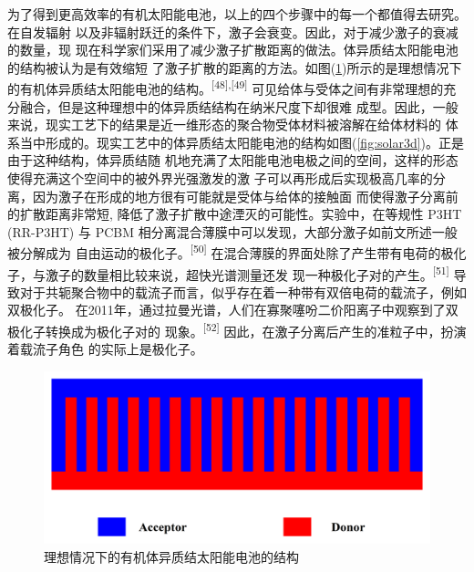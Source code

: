 \documentclass[12pt,]{report}
\begin{document}
为了得到更高效率的有机太阳能电池，以上的四个步骤中的每一个都值得去研究。在自发辐射
以及非辐射跃迁的条件下，激子会衰变。因此，对于减少激子的衰减的数量，现
现在科学家们采用了减少激子扩散距离的做法。体异质结太阳能电池的结构被认为是有效缩短
了激子扩散的距离的方法。如图(\ref{fig:solar})所示的是理想情况下的有机体异质结太阳能电池的结构。\textsuperscript{{[}48{]},{[}49{]}}
可见给体与受体之间有非常理想的充分融合，但是这种理想中的体异质结结构在纳米尺度下却很难
成型。因此，一般来说，现实工艺下的结果是近一维形态的聚合物受体材料被溶解在给体材料的
体系当中形成的。现实工艺中的体异质结太阳能电池的结构如图(\ref{fig:solar3d})。正是由于这种结构，体异质结随
机地充满了太阳能电池电极之间的空间，这样的形态使得充满这个空间中的被外界光强激发的激
子可以再形成后实现极高几率的分离，因为激子在形成的地方很有可能就是受体与给体的接触面
而使得激子分离前的扩散距离非常短,
降低了激子扩散中途湮灭的可能性。实验中，在等规性 P3HT (RR-P3HT) 与 PCBM
相分离混合薄膜中可以发现，大部分激子如前文所述一般被分解成为
自由运动的极化子。\textsuperscript{{[}50{]}}
在混合薄膜的界面处除了产生带有电荷的极化子，与激子的数量相比较来说，超快光谱测量还发
现一种极化子对的产生。\textsuperscript{{[}51{]}}
导致对于共轭聚合物中的载流子而言，似乎存在着一种带有双倍电荷的载流子，例如双极化子。
在2011年，通过拉曼光谱，人们在寡聚噻吩二价阳离子中观察到了双极化子转换成为极化子对的
现象。\textsuperscript{{[}52{]}}
因此，在激子分离后产生的准粒子中，扮演着载流子角色 的实际上是极化子。

\begin{figure}[h!]
    \centering
    \includegraphics[scale=0.8]{./figures/solar2d.png}
    \caption{理想情况下的有机体异质结太阳能电池的结构}
    \label{fig:solar}
\end{figure}
\end{document}
